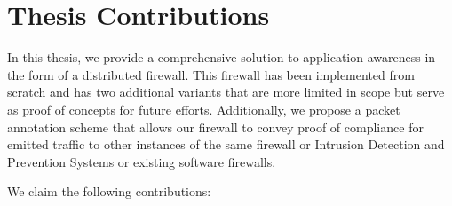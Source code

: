 \section{Thesis Contributions}

In this thesis, we provide a comprehensive solution to application awareness
in the form of a distributed firewall. This firewall has been implemented from
scratch and has two additional variants that are more limited in scope but serve
as proof of concepts for future efforts. Additionally, we propose a packet
annotation scheme that allows our firewall to convey proof of compliance for
emitted traffic to other instances of the same firewall or Intrusion Detection
and Prevention Systems or existing software firewalls.

We claim the following contributions:

